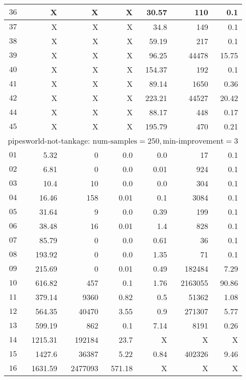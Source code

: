 \begin{longtable}{|c||r|r|r||r|r|r|}
$36$ &  X &  X &  X & 30.57 & 110 & 0.1 \\\hline
$37$ &  X &  X &  X & 34.8 & 149 & 0.1 \\\hline
$38$ &  X &  X &  X & 59.19 & 217 & 0.1 \\\hline
$39$ &  X &  X &  X & 96.25 & 44478 & 15.75 \\\hline
$40$ &  X &  X &  X & 154.37 & 192 & 0.1 \\\hline
$41$ &  X &  X &  X & 89.14 & 1650 & 0.36 \\\hline
$42$ &  X &  X &  X & 223.21 & 44527 & 20.42 \\\hline
$44$ &  X &  X &  X & 88.17 & 448 & 0.17 \\\hline
$45$ &  X &  X &  X & 195.79 & 470 & 0.21 \\\hline

\multicolumn{7}{|l|}{pipesworld-not-tankage: $\text{num-samples}=250,\text{min-improvement}=3$}\\\hline
$01$ & 5.32 & 0 & 0.0 & 0.0 & 17 & 0.1 \\\hline
$02$ & 6.81 & 0 & 0.0 & 0.01 & 924 & 0.1 \\\hline
$03$ & 10.4 & 10 & 0.0 & 0.0 & 304 & 0.1 \\\hline
$04$ & 16.46 & 158 & 0.01 & 0.1 & 3084 & 0.1 \\\hline
$05$ & 31.64 & 9 & 0.0 & 0.39 & 199 & 0.1 \\\hline
$06$ & 38.48 & 16 & 0.01 & 1.4 & 828 & 0.1 \\\hline
$07$ & 85.79 & 0 & 0.0 & 0.61 & 36 & 0.1 \\\hline
$08$ & 193.92 & 0 & 0.0 & 1.35 & 71 & 0.1 \\\hline
$09$ & 215.69 & 0 & 0.01 & 0.49 & 182484 & 7.29 \\\hline
$10$ & 616.82 & 457 & 0.1 & 1.76 & 2163055 & 90.86 \\\hline
$11$ & 379.14 & 9360 & 0.82 & 0.5 & 51362 & 1.08 \\\hline
$12$ & 564.35 & 40470 & 3.55 & 0.9 & 271307 & 5.77 \\\hline
$13$ & 599.19 & 862 & 0.1 & 7.14 & 8191 & 0.26 \\\hline
$14$ & 1215.31 & 192184 & 23.7 & X & X & X \\\hline
$15$ & 1427.6 & 36387 & 5.22 & 0.84 & 402326 & 9.46 \\\hline
$16$ & 1631.59 & 2477093 & 571.18 & X & X & X \\\hline

\end{longtable}
